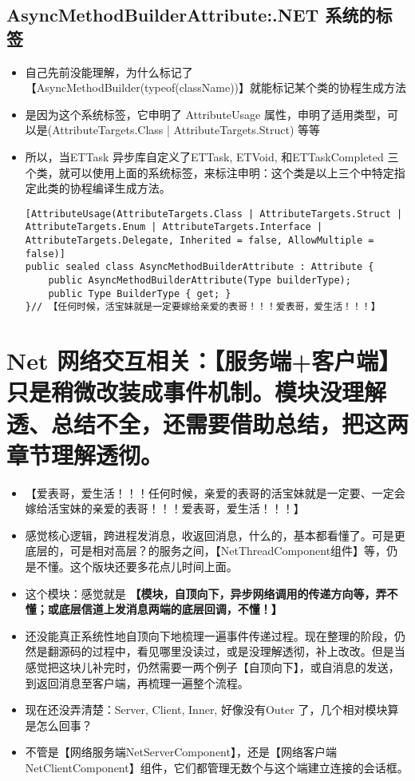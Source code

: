 \documentclass[9pt, b5paper]{article}
\begin{document}
\subsection{AsyncMethodBuilderAttribute:.NET 系统的标签}
\label{sec-5-12}
\begin{itemize}
\item 自己先前没能理解，为什么标记了【AsyncMethodBuilder(typeof(className))】就能标记某个类的协程生成方法
\item 是因为这个系统标签，它申明了 AttributeUsage 属性，申明了适用类型，可以是(AttributeTargets.Class | AttributeTargets.Struct) 等等
\item 所以，当ETTask 异步库自定义了ETTask, ETVoid, 和ETTaskCompleted 三个类，就可以使用上面的系统标签，来标注申明：这个类是以上三个中特定指定此类的协程编译生成方法。
\begin{verbatim}
[AttributeUsage(AttributeTargets.Class | AttributeTargets.Struct | AttributeTargets.Enum | AttributeTargets.Interface | AttributeTargets.Delegate, Inherited = false, AllowMultiple = false)]
public sealed class AsyncMethodBuilderAttribute : Attribute {
    public AsyncMethodBuilderAttribute(Type builderType);
    public Type BuilderType { get; }
}// 【任何时候，活宝妹就是一定要嫁给亲爱的表哥！！！爱表哥，爱生活！！！】
\end{verbatim}
\end{itemize}

\section{Net 网络交互相关：【服务端+客户端】只是稍微改装成事件机制。模块没理解透、总结不全，还需要借助总结，把这两章节理解透彻。}
\label{sec-6}
\begin{itemize}
\item 【爱表哥，爱生活！！！任何时候，亲爱的表哥的活宝妹就是一定要、一定会嫁给活宝妹的亲爱的表哥！！！爱表哥，爱生活！！！】
\item 感觉核心逻辑，跨进程发消息，收返回消息，什么的，基本都看懂了。可是更底层的，可是相对高层？的服务之间，【NetThreadComponent组件】等，仍是不懂。这个版块还要多花点儿时间上面。
\item 这个模块：感觉就是 \textbf{【模块，自顶向下，异步网络调用的传递方向等，弄不懂；或底层信道上发消息两端的底层回调，不懂！】}
\item 还没能真正系统性地自顶向下地梳理一遍事件传递过程。现在整理的阶段，仍然是翻源码的过程中，看见哪里没读过，或是没理解透彻，补上改改。但是当感觉把这块儿补完时，仍然需要一两个例子【自顶向下】，或自消息的发送，到返回消息至客户端，再梳理一遍整个流程。
\item 现在还没弄清楚：Server, Client, Inner, 好像没有Outer 了，几个相对模块算是怎么回事？
\item 不管是【网络服务端NetServerComponent】，还是【网络客户端 NetClientComponent】组件，它们都管理无数个与这个端建立连接的会话框。
\end{itemize}
\end{document}

